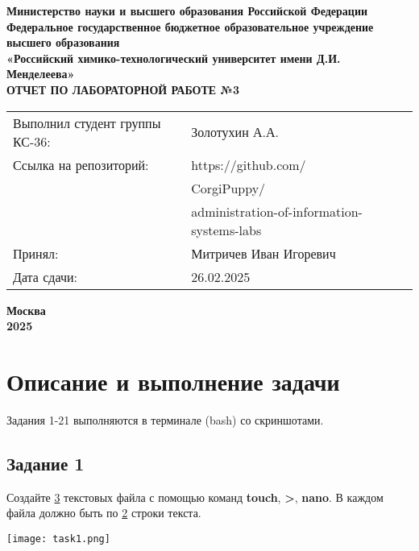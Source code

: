 \documentclass[12pt, a4paper]{report}
\begin{document}
	\begin{titlepage}
			\begin{center}
				\large \textbf{Министерство науки и высшего образования Российской Федерации} \\
				\large \textbf{Федеральное государственное бюджетное образовательное учреждение высшего образования} \\
				\large \textbf{«Российский химико-технологический университет имени Д.И. Менделеева»} \\

				\vspace*{4cm}
				\LARGE \textbf{ОТЧЕТ ПО ЛАБОРАТОРНОЙ РАБОТЕ №3}

				\vspace*{4cm}
				\begin{flushright}
					\Large
					\begin{tabular}{>{\raggedleft\arraybackslash}p{8.85cm} p{10.8cm}}
						Выполнил студент группы КС-36: & Золотухин А.А. \\
						Ссылка на репозиторий: & https://github.com/ \\ 
						& CorgiPuppy/ \\
						& administration-of-information-systems-labs \\
						Принял: & Митричев Иван Игоревич \\
						Дата сдачи: & 26.02.2025 \\
					\end{tabular}

				\end{flushright}

				\vspace*{6cm}
				\Large \textbf{Москва \\ 2025}
			\end{center}
		\end{titlepage}
		
		\tableofcontents	
		\thispagestyle{empty}
		\newpage

		
		\section*{Описание и выполнение задачи}
		\large
		Задания 1-21 выполняются в терминале (bash) со скриншотами. \par

			\subsection*{Задание 1}
			Создайте \underline{3} текстовых файла с помощью команд \textbf{touch}, \textbf{>}, \textbf{nano}. В каждом файла должно быть по \underline{2} строки текста.
			\lstset{style=mystyle}
			
			\begin{center}
				\texttt{[image: task1.png]}
			\end{center}
\end{document}
